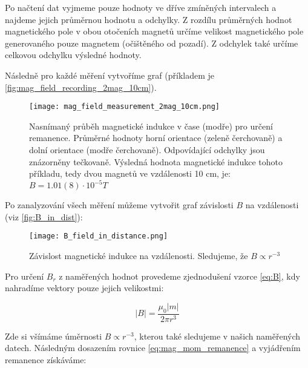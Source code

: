 \documentclass[12pt, a4paper,
 twoside,        %
 openright
]{report}
\begin{document}
Po načtení dat vyjmeme pouze hodnoty ve dříve zmíněných intervalech a najdeme jejich průměrnou hodnotu a odchylky.
Z rozdílu průměrných hodnot magnetického pole v obou otočeních magnetů určíme velikost magnetického pole generovaného pouze magnetem (očištěného od pozadí).
Z odchylek také určíme celkovou odchylku výsledné hodnoty.

Následně pro každé měření vytvoříme graf (příkladem je \autoref{fig:mag_field_recording_2mag_10cm}).



\begin{wrapfigure}{c}{1\textwidth}
    \texttt{[image: mag\_field\_measurement\_2mag\_10cm.png]}
    \centering
    \caption[Nasnímaný průběh magnetické indukce v čase pro účely měření remanence]{Nasnímaný průběh magnetické indukce v čase (modře) pro určení remanence. Průměrné hodnoty horní orientace (zeleně čerchovaně) a dolní orientace (modře čerchovaně). Odpovídající odchylky jsou znázorněny tečkovaně. Výsledná hodnota magnetické indukce tohoto příkladu, tedy dvou magnetů ve vzdálenosti 10 cm, je: $B = 1.01(8) \cdot 10^{-5} T$}
    \label{fig:mag_field_recording_2mag_10cm}
\end{wrapfigure}

\clearpage

Po zanalyzování všech měření můžeme vytvořit graf závislosti $B$ na vzdálenosti (viz \autoref{fig:B_in_dist}):

\begin{wrapfigure}{r}{0.5\textwidth}
    \vspace*{0.5cm}
    \texttt{[image: B\_field\_in\_distance.png]}
    \centering
    \caption[Závislost magnetické indukce na vzdálenosti]{Závislost magnetické indukce na vzdálenosti. Sledujeme, že $B \propto r^{-3}$}
    \label{fig:B_in_dist}
\end{wrapfigure}

Pro určení $B_r$ z naměřených hodnot provedeme zjednodušení vzorce \ref{eq:B}, kdy nahradíme vektory pouze jejich velikostmi:

\begin{equation}
    \label{eq:B_reduced}
    |B| = \frac{{\mu}_0 |m|}{2\pi r^3}
\end{equation}

Zde si všímáme úměrnosti $B \propto r^{-3}$, kterou také sledujeme v našich naměřených datech.
Následným dosazením rovnice \ref{eq:mag_mom_remanence} a vyjádřením remanence získáváme:
\end{document}
